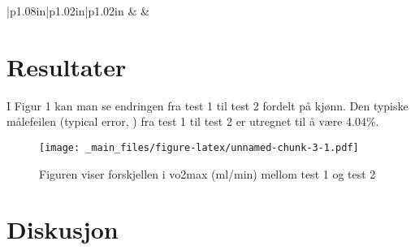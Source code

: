 \documentclass[
]{book}
\begin{document}
\begin{longtable}[c]{|p{1.08in}|p{1.02in}|p{1.02in}}
 &  &  \\

\noalign{\global\setlength{\arrayrulewidth}{2pt}}



\end{longtable}

\hypertarget{resultater}{%
\section{Resultater}\label{resultater}}

I Figur 1 kan man se endringen fra test 1 til test 2 fordelt på kjønn. Den typiske målefeilen (typical error, \citep{hopkins2000}) fra test 1 til test 2 er utregnet til å være 4.04\%.

\begin{figure}
\centering
\texttt{[image: \_main\_files/figure-latex/unnamed-chunk-3-1.pdf]}
\caption{\label{fig:unnamed-chunk-3}Figuren viser forskjellen i vo2max (ml/min) mellom test 1 og test 2}
\end{figure}

\hypertarget{diskusjon}{%
\section{Diskusjon}\label{diskusjon}}
\end{document}
